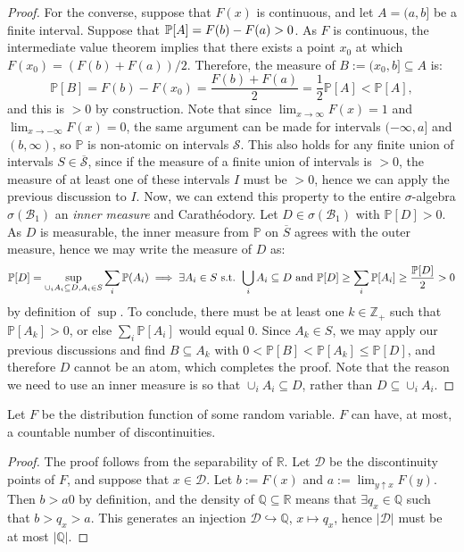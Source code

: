 \begin{proof}
	For the converse, suppose that $F(x)$ is continuous, and let $A = (a, b]$ be a finite interval. Suppose that $\P[A] = F(b) - F(a) > 0$. As $F$ is continuous, the intermediate value theorem implies that there exists a point $x_0$ at which $F(x_0) = (F(b) + F(a)) / 2$. Therefore, the measure of $B := (x_0, b]\subseteq A$ is:
	\begin{equation}
		\mathbb P[B] = F(b) - F(x_0) = \frac{F(b) + F(a)}{2} = \frac{1}{2} \mathbb P[A] < \mathbb P[A],
	\end{equation}
	and this is $> 0$ by construction. Note that since $\lim_{x\rightarrow \infty} F(x) = 1$ and $\lim_{x\rightarrow-\infty} F(x) = 0$, the same argument can be made for intervals $(-\infty, a]$ and $(b, \infty)$, so $\mathbb P$ is non-atomic on intervals $\mathcal S$. This also holds for any finite union of intervals $S \in \overline{\mathcal S}$, since if the measure of a finite union of intervals is $> 0$, the measure of at least one of these intervals $I$ must be $> 0$, hence we can apply the previous discussion to $I$. Now, we can extend this property to the entire $\sigma$-algebra $\sigma(\mathcal B_1)$ an \textit{inner measure} and Carath\'eodory. Let $D\in\sigma(\mathcal B_1)$ with $\mathbb P[D] > 0$. As $D$ is measurable, the inner measure from $\mathbb P$ on $\overline{S}$ agrees with the outer measure, hence we may write the measure of $D$ as:
	\begin{equation}
		\mathbb P[D] = \sup_{\cup_i A_i\subseteq D, A_i\in S} \sum_i \mathbb P(A_i) \implies \exists A_i\in S\textnormal{ s.t. } \bigcup_i A_i\subseteq D\textnormal{ and }\mathbb P[D]\geq \sum_i \mathbb P[A_i] \geq \frac{\mathbb P[D]}{2} > 0
	\end{equation}
	by definition of $\sup$. To conclude, there must be at least one $k\in\mathbb Z_+$ such that $\mathbb P[A_k] > 0$, or else $\sum_i \mathbb P[A_i]$ would equal 0. Since $A_k\in S$, we may apply our previous discussions and find $B\subseteq A_k$ with $0 < \mathbb P[B] < \mathbb P[A_k] \leq \mathbb P[D]$, and therefore $D$ cannot be an atom, which completes the proof. Note that the reason we need to use an inner measure is so that $\cup_i A_i\subseteq D$, rather than $D\subseteq \cup_i A_i$. 
\end{proof}

\begin{prop}
	Let $F$ be the distribution function of some random variable. $F$ can have, at most, a countable number of discontinuities. 
\end{prop}
\begin{proof}
	The proof follows from the separability of $\mathbb R$. Let $\mathcal D$ be the discontinuity points of $F$, and suppose that $x\in\mathcal D$. Let $b := F(x)$ and $a := \lim_{y\uparrow x} F(y)$. Then $b > a0$ by definition, and the density of $\mathbb Q\subseteq\mathbb R$ means that $\exists q_x\in\mathbb Q$ such that $b > q_x > a$. This generates an injection $\mathcal D\hookrightarrow \mathbb Q$, $x\mapsto q_x$, hence $|\mathcal D|$ must be at most $|\mathbb Q|$. 
\end{proof}

